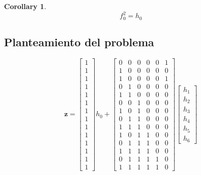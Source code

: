 \documentclass[journal]{IEEEtran}
\newtheorem{corollary}{Corollary}[theorem]
\begin{document}
\begin{corollary}

\begin{equation} 
 f_0^{2} = h_0
\end{equation}
 
\end{corollary}



\subsection{Planteamiento del problema}



\begin{equation}
\mathbf{z}
=  
\begin{bmatrix}
1 \\ 
1 \\ 
1 \\ 
1 \\ 
1 \\ 
1 \\ 
1 \\
1 \\ 
1 \\ 
1 \\ 
1 \\ 
1 \\ 
1 \\ 
1
\end{bmatrix}
h_{0} + 
\begin{bmatrix}
0 & 0 & 0 & 0 & 0 & 1 \\
1 & 0 & 0 & 0 & 0 & 0 \\
1 & 0 & 0 & 0 & 0 & 1 \\
0 & 1 & 0 & 0 & 0 & 0 \\ 
1 & 1 & 0 & 0 & 0 & 0 \\ 
0 & 0 & 1 & 0 & 0 & 0 \\
1 & 0 & 1 & 0 & 0 & 0 \\ 
0 & 1 & 1 & 0 & 0 & 0 \\ 
1 & 1 & 1 & 0 & 0 & 0 \\ 
1 & 0 & 1 & 1 & 0 & 0 \\ 
0 & 1 & 1 & 1 & 0 & 0 \\ 
1 & 1 & 1 & 1 & 0 & 0 \\
0 & 1 & 1 & 1 & 1 & 0 \\
1 & 1 & 1 & 1 & 1 & 0 
\end{bmatrix} 
\begin{bmatrix}
h_{1} \\
h_{2} \\
h_{3} \\
h_{4} \\
h_{5} \\
h_{6}
\end{bmatrix} 
\end{equation}
\end{document}
